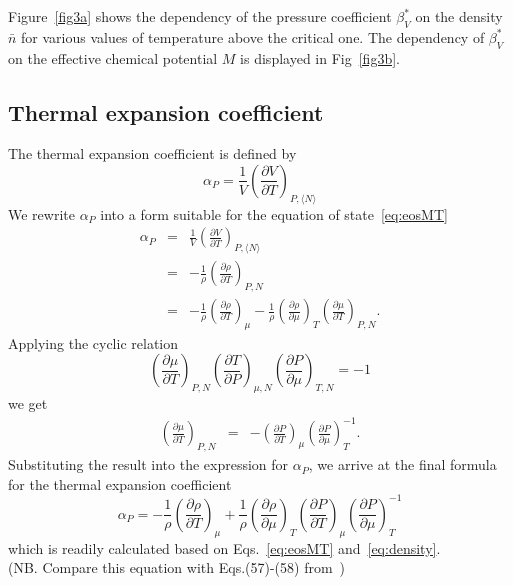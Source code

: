 \documentclass[12pt]{article}
\begin{document}
	Figure~\ref{fig3a} shows the dependency of the pressure coefficient $\beta^*_V$ on the density $\bar{n}$ for various values of temperature above the critical one. The dependency of $\beta^*_V$ on the effective chemical potential $M$ is displayed in Fig~\ref{fig3b}.
	
	\subsection{Thermal expansion coefficient}
	The thermal expansion coefficient is defined by
	\begin{equation}
		\alpha_P = \frac{1}{V}\left(\frac{\partial V}{\partial T}\right)_{P,\langle N\rangle}
	\end{equation}
	We rewrite $\alpha_P$ into a form suitable for the equation of state~\eqref{eq:eosMT}
	\begin{eqnarray*}
		\alpha_P & = & \frac{1}{V}\left(\frac{\partial V}{\partial T}\right)_{P,\langle N\rangle}
		\\
		& = & -\frac{1}{\rho} \left(\frac{\partial \rho}{\partial T}\right)_{P, N}
		\\
		& = & -\frac{1}{\rho} \left(\frac{\partial \rho}{\partial T}\right)_{\mu} 
		 - \frac{1}{\rho} \left(\frac{\partial \rho}{\partial \mu}\right)_{T}
		 \left(\frac{\partial \mu}{\partial T}\right)_{P, N}.
	\end{eqnarray*}
	Applying the cyclic relation
	\begin{equation*}
		\left(\frac{\partial \mu}{\partial T}\right)_{P, N}
		\left(\frac{\partial T}{\partial P}\right)_{\mu, N}
		\left(\frac{\partial P}{\partial \mu}\right)_{T, N}
		= -1
	\end{equation*}
	we get
	\begin{eqnarray*}
		\left(\frac{\partial \mu}{\partial T}\right)_{P, N} & = & 
		- \left(\frac{\partial P}{\partial T}\right)_{\mu}
		\left(\frac{\partial P}{\partial \mu}\right)^{-1}_{T}.
	\end{eqnarray*}
	Substituting the result into the expression for $\alpha_P$, we arrive at the final formula for the thermal expansion coefficient
	\begin{equation}
		\alpha_P = -\frac{1}{\rho}\left(\frac{\partial \rho}{\partial T}\right)_{\mu}
		+ \frac{1}{\rho} \left(\frac{\partial \rho}{\partial \mu}\right)_{T}
		\left(\frac{\partial P}{\partial T}\right)_{\mu}
		\left(\frac{\partial P}{\partial \mu}\right)^{-1}_{T}
	\end{equation}
	which is readily calculated based on Eqs.~\eqref{eq:eosMT} and~\eqref{eq:density}.\\
	(NB. Compare this equation with Eqs.(57)-(58) from~\cite{StrokerMeier2021})
	
\end{document}
